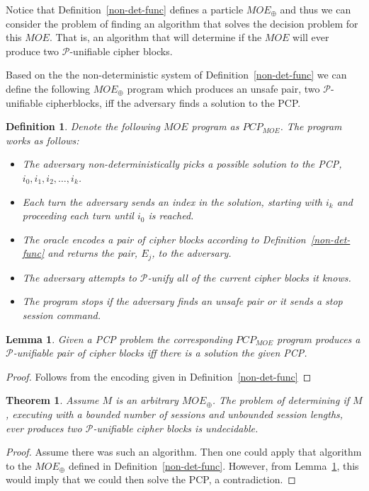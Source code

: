 \documentclass{easychair}
\newtheorem{definition}{Definition}
\newtheorem{theorem}{Theorem}
\newtheorem{lemma}{Lemma}
\begin{document}
Notice that Definition~\ref{non-det-func} defines a 
particle $MOE_{\oplus}$ and thus we can consider the problem 
of finding an algorithm that solves the decision problem for
this $MOE$. That is, an algorithm that will determine if 
the $MOE$ will ever produce two $\mathcal{P}$-unifiable
cipher blocks.

Based on the the non-deterministic system of 
Definition~\ref{non-det-func} we can define the following
$MOE_{\oplus}$ program which produces an unsafe pair, 
two $\mathcal{P}$-unifiable cipherblocks, iff the adversary
finds a solution to the PCP.

\begin{definition}
Denote the following $MOE$ program as $PCP_{MOE}$.
The program works as follows:
\begin{itemize}
	\item The adversary non-deterministically picks a possible
	solution to the PCP, $i_0, i_1, i_2, \ldots, i_k$.
	\item Each turn the adversary sends an index in the solution, 
	starting with $i_k$ and proceeding each turn until $i_0$ 
	is reached. 
	\item The oracle encodes a pair of cipher blocks according 
	to Definition~\ref{non-det-func} and returns the pair,
	$E_j$, to the adversary.
	\item The adversary attempts to $\mathcal{P}$-unify 
	all of the current cipher blocks it knows. 
	\item The program stops if the adversary finds an unsafe
	pair or it sends a stop session command.
\end{itemize}
\end{definition}

\begin{lemma}\label{lemma:pcp_to_moe}
Given a PCP problem the corresponding $PCP_{MOE}$ program 
produces a $\mathcal{P}$-unifiable pair of cipher blocks
iff there is a solution the given PCP. 
\end{lemma}
\begin{proof}
Follows from the encoding given in Definition~\ref{non-det-func}
\end{proof}



\begin{theorem}
	Assume $M$ is an arbitrary $MOE_{\oplus}$. The problem
	of determining if $M$, executing with 
	a bounded number of sessions and unbounded session
	lengths, ever produces two  $\mathcal{P}$-unifiable cipher blocks is undecidable. 
\end{theorem}
\begin{proof}
	Assume there was such an algorithm. Then one could apply that
	algorithm to the $MOE_{\oplus}$ defined in
	Definition~\ref{non-det-func}. However, 
	from Lemma~\ref{lemma:pcp_to_moe}, this would
	imply that we could then solve the PCP, a contradiction.   
\end{proof}
\end{document}
